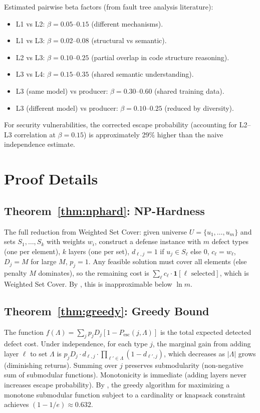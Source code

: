 \documentclass[11pt, a4paper, copyright]{googledeepmind}
\newcommand{\Pesc}{P_{\mathrm{esc}}}
\begin{document}
\begin{appendices}
Estimated pairwise beta factors (from fault tree analysis literature):

\begin{itemize}
\item L1 vs L2: $\beta = 0.05$--$0.15$ (different mechanisms).
\item L1 vs L3: $\beta = 0.02$--$0.08$ (structural vs semantic).
\item L2 vs L3: $\beta = 0.10$--$0.25$ (partial overlap in code structure reasoning).
\item L3 vs L4: $\beta = 0.15$--$0.35$ (shared semantic understanding).
\item L3 (same model) vs producer: $\beta = 0.30$--$0.60$ (shared training data).
\item L3 (different model) vs producer: $\beta = 0.10$--$0.25$ (reduced by diversity).
\end{itemize}

For security vulnerabilities, the corrected escape probability (accounting for L2--L3 correlation at $\beta = 0.15$) is approximately 29\% higher than the naive independence estimate.

\section{Proof Details}
\label{app:proofs}

\subsection{Theorem~\ref{thm:nphard}: NP-Hardness}

The full reduction from Weighted Set Cover: given universe $U = \{u_1, \ldots, u_m\}$ and sets $S_1, \ldots, S_k$ with weights $w_i$, construct a defense instance with $m$ defect types (one per element), $k$ layers (one per set), $d_{\ell,j} = 1$ if $u_j \in S_\ell$ else $0$, $c_\ell = w_\ell$, $D_j = M$ for large $M$, $p_j = 1$. Any feasible solution must cover all elements (else penalty $M$ dominates), so the remaining cost is $\sum_\ell c_\ell \cdot \mathbf{1}[\ell \text{ selected}]$, which is Weighted Set Cover. By \citet{dinur2014}, this is inapproximable below $\ln m$.

\subsection{Theorem~\ref{thm:greedy}: Greedy Bound}

The function $f(\Lambda) = \sum_j p_j D_j [1 - \Pesc(j, \Lambda)]$ is the total expected detected defect cost. Under independence, for each type $j$, the marginal gain from adding layer $\ell$ to set $\Lambda$ is $p_j D_j \cdot d_{\ell,j} \cdot \prod_{\ell' \in \Lambda}(1-d_{\ell',j})$, which decreases as $|\Lambda|$ grows (diminishing returns). Summing over $j$ preserves submodularity (non-negative sum of submodular functions). Monotonicity is immediate (adding layers never increases escape probability). By \citet{nemhauser1978}, the greedy algorithm for maximizing a monotone submodular function subject to a cardinality or knapsack constraint achieves $(1-1/e) \approx 0.632$.

\end{appendices}
\end{document}
